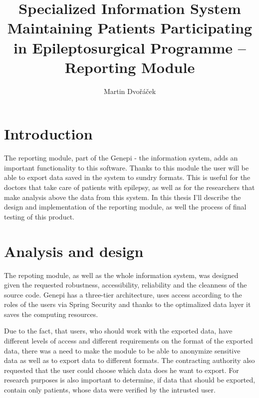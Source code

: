 \documentclass[thesis=B,english]{FITthesis}[2012/10/20]
\title{Specialized Information System Maintaining Patients Participating in Epileptosurgical Programme – Reporting Module}
\author{Martin Dvořáček} %
\begin{document}

\chapter{Introduction}
The reporting module, part of the Genepi - the information system, adds an important functionality to this software. Thanks to this module the user will be able to export data saved in the system to sundry formats. This is useful for the doctors that take care of patients with epilepsy, as well as for the researchers that make analysis above the data from this system. In this thesis I'll describe the design and implementation of the reporting module, as well the process of final testing of this product.

\chapter{Analysis and design}
The repoting module, as well as the whole information system, was designed given the requested robustness, accessibility, reliability and the cleanness of the source code. Genepi has a three-tier architecture, uses access according to the roles of the users via Spring Security and thanks to the optimalized data layer it saves the computing resources.

Due to the fact, that users, who should work with the exported data, have different levels of access and different requirements on the format of the exported data, there was a need to make the module to be able to anonymize sensitive data as well as to export data to different formats. The contracting authority also requested that the user could choose which data does he want to export. For research purposes is also important to determine, if data that should be exported, contain only patients, whose data were verified by the intrusted user.
\end{document}

